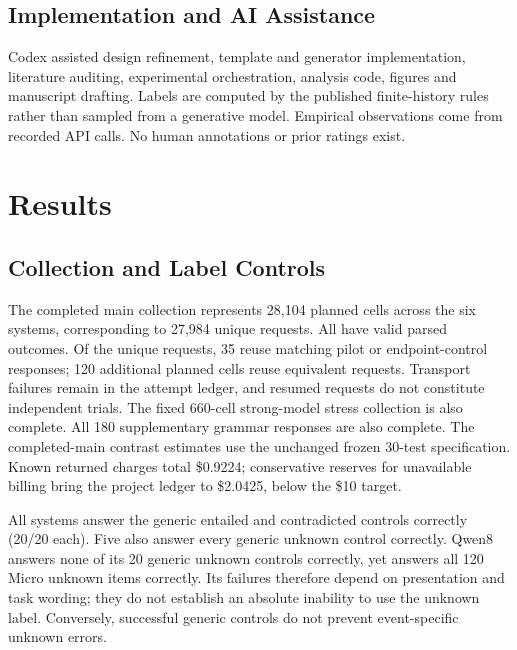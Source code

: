 \documentclass[sigconf,anonymous,review]{acmart}
\begin{document}
\subsection{Implementation and AI Assistance}
Codex assisted design refinement, template and generator implementation, literature auditing, experimental orchestration, analysis code, figures and manuscript drafting. Labels are computed by the published finite-history rules rather than sampled from a generative model. Empirical observations come from recorded API calls. No human annotations or prior ratings exist.

\section{Results}
\subsection{Collection and Label Controls}
The completed main collection represents 28,104 planned cells across the six systems, corresponding to 27,984 unique requests. All have valid parsed outcomes. Of the unique requests, 35 reuse matching pilot or endpoint-control responses; 120 additional planned cells reuse equivalent requests. Transport failures remain in the attempt ledger, and resumed requests do not constitute independent trials. The fixed 660-cell strong-model stress collection is also complete. All 180 supplementary grammar responses are also complete. The completed-main contrast estimates use the unchanged frozen 30-test specification. Known returned charges total \$0.9224; conservative reserves for unavailable billing bring the project ledger to \$2.0425, below the \$10 target.

All systems answer the generic entailed and contradicted controls correctly (20/20 each). Five also answer every generic unknown control correctly. Qwen8 answers none of its 20 generic unknown controls correctly, yet answers all 120 Micro unknown items correctly. Its failures therefore depend on presentation and task wording; they do not establish an absolute inability to use the unknown label. Conversely, successful generic controls do not prevent event-specific unknown errors.
\end{document}
